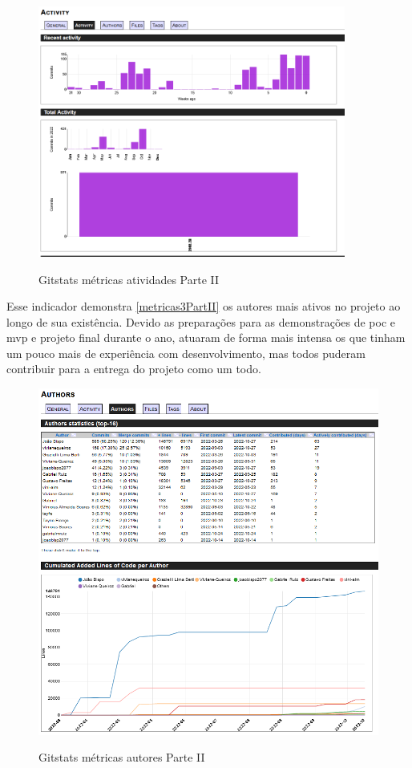 \begin{figure}[htb]
	\centering
	\caption{\label{fig_arq_virado}Gitstats métricas atividades Parte II}
	\includegraphics[width=0.90\textwidth]{anexos/metricas2PartII.png}
	\label{metricas2PartII}
\end{figure}

Esse indicador demonstra \autoref{metricas3PartII} os autores mais ativos no projeto ao longo de sua existência. Devido as preparações para as demonstrações de \ac{poc} e \ac{mvp} e projeto final durante o ano, atuaram de forma mais intensa os que tinham um pouco mais de experiência com desenvolvimento, mas todos puderam contribuir para a entrega do projeto como um todo. 

\begin{figure}[htb]
	\centering
	\caption{\label{fig_arq_virado}Gitstats métricas autores Parte II}
	\includegraphics[width=1.00\textwidth]{anexos/metricas3PartII.png}
	\label{metricas3PartII}
\end{figure}

